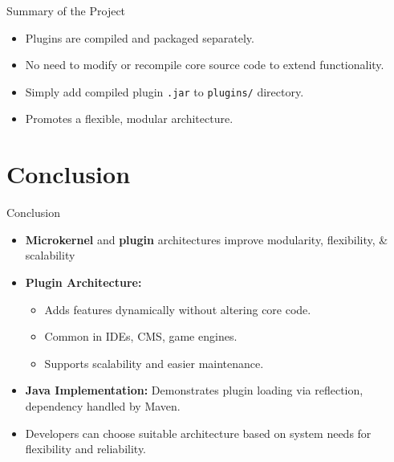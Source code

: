 \documentclass[aspectratio=169, table]{beamer}
\begin{document}
\begin{frame}[fragile]{Summary of the Project}
	\vspace{20pt}
	\begin{itemize}
		\item Plugins are compiled and packaged separately.
		\item No need to modify or recompile core source code to extend functionality.
		\item Simply add compiled plugin \texttt{.jar} to \texttt{plugins/} directory.
		\item Promotes a flexible, modular architecture.
	\end{itemize}
\end{frame}

\section{Conclusion}

\begin{frame}{Conclusion}
	\vspace{15pt}
	\begin{itemize}
		\item \textbf{Microkernel} and \textbf{plugin} architectures improve modularity, flexibility, \& scalability
		
		\item \textbf{Plugin Architecture:}
		\begin{itemize}
			\item Adds features dynamically without altering core code.
			\item Common in IDEs, CMS, game engines.
			\item Supports scalability and easier maintenance.
		\end{itemize}
		
		\item \textbf{Java Implementation:} Demonstrates plugin loading via reflection, dependency handled by Maven.
		
		\item Developers can choose suitable architecture based on system needs for flexibility and reliability.
	\end{itemize}
\end{frame}
\end{document}
